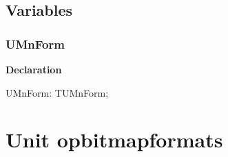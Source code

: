 \documentclass{report}
\newif\ifpdf
\begin{document}
\section{Variables}
\ifpdf
\subsection*{\large{\textbf{UMnForm}}\normalsize\hspace{1ex}\hrulefill}
\else
\subsection*{UMnForm}
\fi
\label{mnupdate-UMnForm}
\begin{list}{}{
\setlength{\itemindent}{0cm}
\setlength{\listparindent}{0cm}
\setlength{\leftmargin}{\evensidemargin}
\addtolength{\leftmargin}{\tmplength}
\settowidth{\labelsep}{X}
\addtolength{\leftmargin}{\labelsep}
\setlength{\labelwidth}{\tmplength}
}
\item[\textbf{Declaration}\hfill]
\ifpdf
\begin{flushleft}
\fi
\begin{ttfamily}
UMnForm: TUMnForm;\end{ttfamily}

\ifpdf
\end{flushleft}
\fi

\end{list}
\chapter{Unit opbitmapformats}
\label{opbitmapformats}
\end{document}
